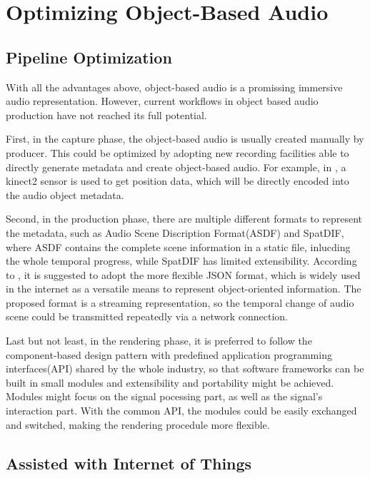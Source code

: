 \documentclass[jou]{apa6}
\begin{document}
\section{Optimizing Object-Based Audio}

\subsection{Pipeline Optimization}

With all the advantages above, object-based audio is a promissing immersive audio representation. However, current workflows in object based audio production have not reached its full potential.

First, in the capture phase, the object-based audio is usually created manually by producer. This could be optimized by adopting new recording facilities able to directly generate metadata and create object-based audio. For example, in \textcite{coleman2018audio}, a kinect2 sensor is used to get position data, which will be directly encoded into the audio object metadata.

Second, in the production phase, there are multiple different formats to represent the metadata, such as Audio Scene Discription Format(ASDF) and SpatDIF, where ASDF contains the complete scene information in a static file, inlucding the whole temporal progress, while SpatDIF has limited extensibility. According to \textcite{coleman2018audio}, it is suggested to adopt the more flexible JSON format, which is widely used in the internet as a versatile means to represent object-oriented information. The proposed format is a streaming representation, so the temporal change of audio scene could be transmitted repeatedly via a network connection.

Last but not least, in the rendering phase, it is preferred to follow the component-based design pattern with predefined application programming interfaces(API) shared by the whole industry, so that software frameworks can be built in small modules and extensibility and portability might be achieved. Modules might focus on the signal pocessing part, as well as the signal's interaction part. With the common API, the modules could be easily exchanged and switched, making the rendering procedule more flexible.

\subsection{Assisted with Internet of Things}
\end{document}
